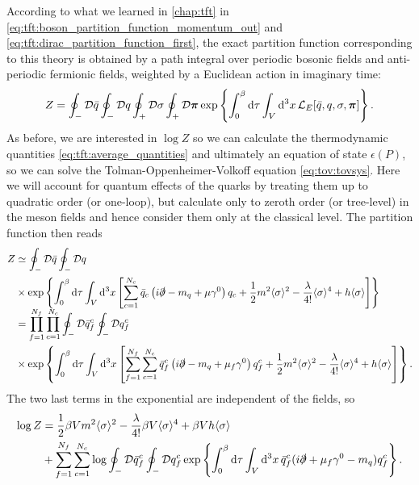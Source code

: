 According to what we learned in \cref{chap:tft} in \cref{eq:tft:boson_partition_function_momentum_out} and \eqref{eq:tft:dirac_partition_function_first},
the exact partition function corresponding to this theory is obtained by a path integral over periodic bosonic fields and anti-periodic fermionic fields, weighted by a Euclidean action in imaginary time:
\begin{equation}
	Z = \oint_- \mathcal{D} \bar{q} \oint_- \mathcal{D} q \oint_+ \mathcal{D} \sigma \oint_+ \mathcal{D} {\bm{\pi}} \exp \left\{ \int_0^\beta \mathop{}\!\mathrm{d} \tau \int_V \mathop{}\!\mathrm{d}^3 x \, \mathcal{L}_E[\bar{q}, q, \sigma, {\bm{\pi}}]  \right\} .
\end{equation}
As before, we are interested in $\log Z$ so we can calculate the thermodynamic quantities \eqref{eq:tft:average_quantities} and ultimately an equation of state $\epsilon(P)$, so we can solve the Tolman-Oppenheimer-Volkoff equation \eqref{eq:tov:tovsys}.
Here we will account for quantum effects of the quarks by treating them up to quadratic order (or one-loop),
but calculate only to zeroth order (or tree-level) in the meson fields and hence consider them only at the classical level.
The partition function then reads
\begin{equation}
\begin{split}
	Z &\simeq \oint_- \mathcal{D} \bar{q} \oint_- \mathcal{D} q \\
	  &\times  \exp \left\{ \int_0^{\beta} \mathop{}\!\mathrm{d} \tau \int_V \mathop{}\!\mathrm{d}^3 x \left[ \sum_{c=1}^{N_c} \bar{q}_c \left( i \slashed\partial -m_q + \mu \gamma^0 \right) q_c + \frac12 m^2 \langle \sigma \rangle^2 - \frac{\lambda}{4!} \langle \sigma \rangle^4 + h \langle \sigma \rangle \right] \right\} \\
	  &=       \prod_{f=1}^{\smash{N_f}} \prod_{c=1}^{\smash{N_c}} \oint_- \mathcal{D} \bar{q}_f^c \oint_- \mathcal{D} q_f^c \\
	  &\times  \exp \left\{ \int_0^{\beta} \mathop{}\!\mathrm{d} \tau \int_V \mathop{}\!\mathrm{d}^3 x \left[ \sum_{f=1}^{\smash{N_f}} \sum_{c=1}^{N_c} \bar{q}_f^c \left( i \slashed\partial - m_q + \mu_f \gamma^0 \right) q_f^c + \frac12 m^2 \langle \sigma \rangle^2 - \frac{\lambda}{4!} \langle \sigma \rangle^4 + h \langle \sigma \rangle \right] \right\}.
\end{split}
\end{equation}
The two last terms in the exponential are independent of the fields, so
\begin{equation}
\begin{split}
	\log Z &= \frac12 \beta V m^2 \langle \sigma \rangle^2 - \frac{\lambda}{4!} \beta V \langle \sigma \rangle^4 + \beta V h \langle \sigma \rangle \\
	       &+ \sum_{f=1}^{N_f} \sum_{c=1}^{N_c} \log \oint_- \mathcal{D} \bar{q}_f^c \oint_- \mathcal{D} q_f^c \exp \left\{ \int_0^\beta \mathop{}\!\mathrm{d} \tau \int_V \mathop{}\!\mathrm{d}^3 x \, \bar{q}_f^c (i \slashed\partial + \mu_f \gamma^0 - m_q) q_f^c \right\} .
\end{split}
\end{equation}
